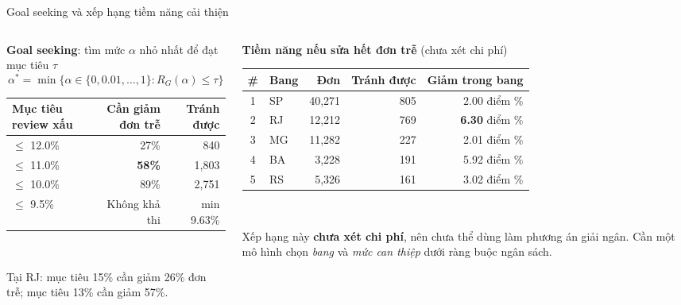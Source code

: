 \documentclass[aspectratio=169,10pt,xcolor=table]{beamer}
\begin{document}
\begin{frame}{Goal seeking và xếp hạng tiềm năng cải thiện}
  \begin{columns}[T]
    \begin{column}{0.47\textwidth}
      \footnotesize
      \textbf{Goal seeking}: tìm mức $\alpha$ nhỏ nhất để đạt mục tiêu $\tau$
      \[ \alpha^* = \min\{\alpha\in\{0,0.01,\dots,1\} : R_G(\alpha) \le \tau\} \]
      \begin{tabular}{@{}lrr@{}}
        \toprule
        Mục tiêu review xấu & Cần giảm đơn trễ & Tránh được\\
        \midrule
        $\le$ 12.0\% & 27\% & 840\\
        $\le$ 11.0\% & \textbf{58\%} & 1,803\\
        $\le$ 10.0\% & 89\% & 2,751\\
        $\le$ 9.5\% & \textcolor{bad}{Không khả thi} & min 9.63\%\\
        \bottomrule
      \end{tabular}\\[0.1cm]
      {\scriptsize Tại RJ: mục tiêu 15\% cần giảm 26\% đơn trễ; mục tiêu 13\% cần giảm 57\%.\par}
    \end{column}
    \begin{column}{0.5\textwidth}
      \footnotesize
      \textbf{Tiềm năng nếu sửa hết đơn trễ} (chưa xét chi phí)\\[0.1cm]
      \begin{tabular}{@{}clrrr@{}}
        \toprule
        \# & Bang & Đơn & Tránh được & Giảm trong bang\\
        \midrule
        1 & SP & 40,271 & 805 & 2.00 điểm \%\\
        2 & RJ & 12,212 & 769 & \textbf{6.30} điểm \%\\
        3 & MG & 11,282 & 227 & 2.01 điểm \%\\
        4 & BA & 3,228 & 191 & 5.92 điểm \%\\
        5 & RS & 5,326 & 161 & 3.02 điểm \%\\
        \bottomrule
      \end{tabular}\\[0.15cm]
      \begin{warnbox}
        Xếp hạng này \textbf{chưa xét chi phí}, nên chưa thể dùng làm phương án giải ngân. Cần một mô hình chọn \emph{bang} và \emph{mức can thiệp} dưới ràng buộc ngân sách.
      \end{warnbox}
    \end{column}
  \end{columns}
\end{frame}
\end{document}
